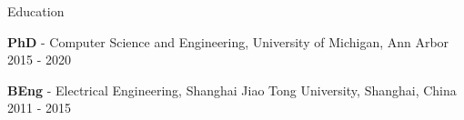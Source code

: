 \begin{rSection}{Education}

{\bf PhD} - {Computer Science and Engineering, University of Michigan, Ann Arbor} \hfill {2015 - 2020}

{\bf BEng} - {Electrical Engineering, Shanghai Jiao Tong University}, {Shanghai, China} \hfill {2011 - 2015}
\end{rSection}
